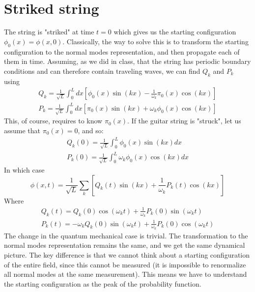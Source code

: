 \documentclass{article}
\begin{document}
\section{Striked string}
The string is "striked" at time $t = 0$ which gives us the starting configuration $\phi_0(x) = \phi(x,0)$. Classically, the way to solve this is to transform the starting configuration to the normal modes representation, and then propagate each of them in time. Assuming, as we did in class, that the string has periodic boundary conditions and can therefore contain traveling waves, we can find $Q_k$ and $P_k$ using
\begin{equation}
\begin{gathered}
    Q_k = \frac{1}{\sqrt{L}}\int_0^L dx \left[\phi_0(x)\sin(kx) - \frac{1}{\omega_k}\pi_0(x)\cos(kx)\right]
    \\
    P_k = \frac{1}{\sqrt{L}}\int_0^L dx \left[\pi_0(x)\sin(kx) + \omega_k\phi_0(x)\cos(kx)\right]
\end{gathered}
\end{equation}
This, of course, requires to know $\pi_0(x)$. If the guitar string is "struck", let us assume that $\pi_0(x) = 0$, and so:
\begin{equation}
\begin{gathered}
    Q_k(0) = \frac{1}{\sqrt{L}}\int_0^L \phi_0(x)\sin(kx) dx
    \\
    P_k(0) = \frac{1}{\sqrt{L}}\int_0^L \omega_k\phi_0(x)\cos(kx) dx
\end{gathered}
\end{equation}
In which case
\begin{equation}
    \phi(x,t) = \frac{1}{\sqrt{L}}\sum_k \left[Q_k(t)\sin(kx) + \frac{1}{\omega_k}P_k(t)\cos(kx)\right]
\end{equation}
Where
\begin{equation}
\begin{gathered}
    Q_k(t) = Q_k(0)\cos(\omega_k t) + \frac{1}{\omega_k}P_k(0)\sin(\omega_k t)
    \\
    P_k(t) = -\omega_k Q_k(0)\sin(\omega_k t) + \frac{1}{\omega_k}P_k(0)\cos(\omega_k t)
\end{gathered}
\end{equation}
The change in the quantum mechanical case is trivial. The transformation to the normal modes representation remains the same, and we get the same dynamical picture. The key difference is that we cannot think about a starting configuration of the entire field, since this cannot be measured (it is impossible to renormalize all normal modes at the same measurement). This means we have to understand the starting configuration as the peak of the probability function.
\end{document}
